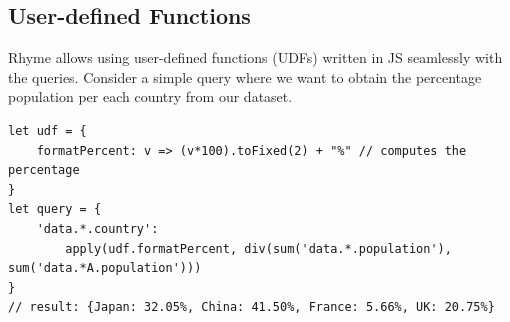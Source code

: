 \documentclass[runningheads]{llncs}
\newcommand{\lang}{Rhyme}
\begin{document}





\vspace{-3mm}
\subsection{User-defined Functions}
\vspace{-2mm}
\lang{} allows using user-defined functions (UDFs) written in JS seamlessly with the
queries.
Consider a simple query where we want to obtain the percentage population per each
country from our dataset.

\begin{lstlisting}[style=JavaScript, columns=flexible]
let udf = {
    formatPercent: v => (v*100).toFixed(2) + "%" // computes the percentage 
}
let query = {
    'data.*.country':
        apply(udf.formatPercent, div(sum('data.*.population'), sum('data.*A.population')))
}
// result: {Japan: 32.05%, China: 41.50%, France: 5.66%, UK: 20.75%}
\end{lstlisting}
\end{document}
